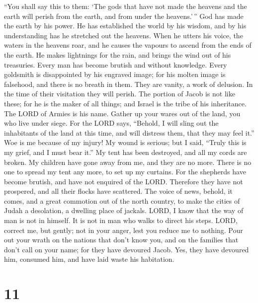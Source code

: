 ``You shall say this to them: `The gods that have not
made the heavens and the earth will perish from the earth, and from
under the heavens.'\,''  God has made the earth by his
power. He has established the world by his wisdom, and by his
understanding has he stretched out the heavens.  When he
utters his voice, the waters in the heavens roar, and he causes the
vapours to ascend from the ends of the earth. He makes lightnings for
the rain, and brings the wind out of his treasuries. 
Every man has become brutish and without knowledge. Every goldsmith is
disappointed by his engraved image; for his molten image is falsehood,
and there is no breath in them.  They are vanity, a work
of delusion. In the time of their visitation they will perish.
 The portion of Jacob is not like these; for he is the
maker of all things; and Israel is the tribe of his inheritance. The
LORD of Armies is his name.  Gather up your wares out of
the land, you who live under siege.  For the LORD says,
``Behold, I will sling out the inhabitants of the land at this time, and
will distress them, that they may feel it.''  Woe is me
because of my injury! My wound is serious; but I said, ``Truly this is
my grief, and I must bear it.''  My tent has been
destroyed, and all my cords are broken. My children have gone away from
me, and they are no more. There is no one to spread my tent any more, to
set up my curtains.  For the shepherds have become
brutish, and have not enquired of the LORD. Therefore they have not
prospered, and all their flocks have scattered.  The
voice of news, behold, it comes, and a great commotion out of the north
country, to make the cities of Judah a desolation, a dwelling place of
jackals.  LORD, I know that the way of man is not in
himself. It is not in man who walks to direct his steps. 
LORD, correct me, but gently; not in your anger, lest you reduce me to
nothing.  Pour out your wrath on the nations that don't
know you, and on the families that don't call on your name; for they
have devoured Jacob. Yes, they have devoured him, consumed him, and have
laid waste his habitation.

\hypertarget{section-10}{%
\section{11}\label{section-10}}

